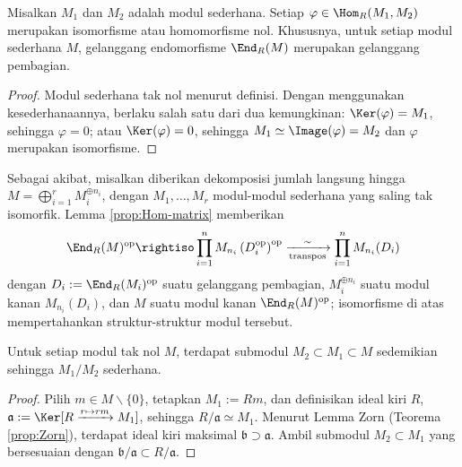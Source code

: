 \begin{lemma}\label{prop:Schur-mod}
	Misalkan $M_1$ dan $M_2$ adalah modul sederhana. Setiap $\varphi \in \Hom_R(M_1, M_2)$ merupakan isomorfisme atau homomorfisme nol. Khususnya, untuk setiap modul sederhana $M$, gelanggang endomorfisme $\End_R(M)$ merupakan gelanggang pembagian.
\end{lemma}
\begin{proof}
	Modul sederhana tak nol menurut definisi. Dengan menggunakan kesederhanaannya, berlaku salah satu dari dua kemungkinan: $\Ker(\varphi) = M_1$, sehingga $\varphi=0$; atau $\Ker(\varphi)=0$, sehingga $M_1 \simeq \Image(\varphi) = M_2$ dan $\varphi$ merupakan isomorfisme.
\end{proof}

Sebagai akibat, misalkan diberikan dekomposisi jumlah langsung hingga $M = \bigoplus_{i=1}^r M_i^{\oplus n_i}$, dengan $M_1, \ldots, M_r$ modul-modul sederhana yang saling tak isomorfik. Lemma \ref{prop:Hom-matrix} memberikan
\[ \End_R(M)^{\text{op}} \rightiso \prod_{i=1}^n M_{n_i}\left(D_i^{\text{op}}\right)^{\text{op}} \xrightarrow[\text{transpos}]{\sim} \prod_{i=1}^n M_{n_i}(D_i) \]
dengan $D_i := \End_R(M_i)^\text{op}$ suatu gelanggang pembagian, $M_i^{\oplus n_i}$ suatu modul kanan $M_{n_i}(D_i)$, dan $M$ suatu modul kanan $\End_R(M)^\text{op}$; isomorfisme di atas mempertahankan struktur-struktur modul tersebut.

\begin{lemma}\label{prop:existence-simple-subquotient}
	Untuk setiap modul tak nol $M$, terdapat submodul $M_2 \subset M_1 \subset M$ sedemikian sehingga $M_1/M_2$ sederhana.
\end{lemma}
\begin{proof}
	Pilih $m \in M \smallsetminus \{0\}$, tetapkan $M_1 := Rm$, dan definisikan ideal kiri $R$, $\mathfrak{a} := \Ker[R \xrightarrow{r \mapsto rm} M_1]$, sehingga $R/\mathfrak{a} \simeq M_1$. Menurut Lemma Zorn (Teorema \ref{prop:Zorn}), terdapat ideal kiri maksimal $\mathfrak{b} \supset \mathfrak{a}$. Ambil submodul $M_2 \subset M_1$ yang bersesuaian dengan $\mathfrak{b}/\mathfrak{a} \subset R/\mathfrak{a}$.
\end{proof}

